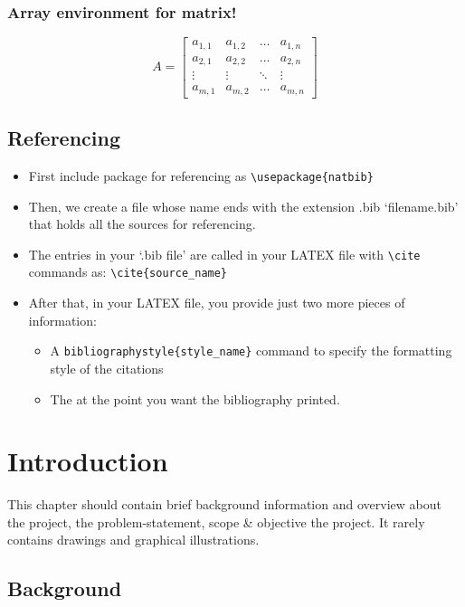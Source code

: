 \documentclass[12pt,a4paper]{report}
\begin{document}
\subsection{Array environment for matrix!}
\begin{equation}
A=\left[
\begin{array}{cccc}
a_{1,1} & a_{1,2} & \ldots & a_{1,n}\\
a_{2,1} & a_{2,2} & \ldots & a_{2,n}\\
\vdots  & \vdots  & \ddots & \vdots \\
a_{m,1} & a_{m,2} & \ldots & a_{m,n}
\end{array}
\right]
\end{equation}
\section{Referencing}
\begin{itemize}
    \item First include package for referencing as \verb!\usepackage{natbib}! 
    \item Then, we create a file whose name ends with the extension .bib ‘filename.bib’ that holds all the sources for referencing.
    \item The entries in your ‘.bib file’ are called in your LATEX file with \verb!\cite! commands as: \verb!\cite{source_name}!
    \item After that, in your LATEX file, you provide just two more pieces of information:
    \begin{itemize}
        \item A \verb!bibliographystyle{style_name}! command to specify the formatting style of the citations
        \item The \verb!! at the point you want the bibliography printed.
    \end{itemize}
\end{itemize}
\chapter{Introduction}
\fancyhf{}
\fancyfoot[R]{\thepage}
This chapter should contain brief background information and overview about the project, the problem-statement, scope \& objective the project. It rarely contains drawings and graphical illustrations.
\section{Background}
\end{document}

